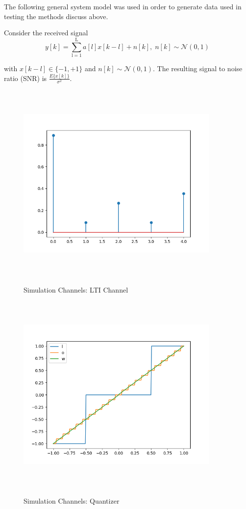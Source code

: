 \documentclass[12pt,a4paper]{report}
\begin{document}
The following general system model was used in order to generate data used in testing the methods discuss above.


Consider the received signal 
\begin{equation}
y[k] = \sum_{\mathrm{l=1}}^{\mathrm{L}} a[l]x[k-l] + n[k], \; n[k]  \sim \mathcal{N}(0,1)
\end{equation}

with $x[k-l] \in \{ -1, +1\}$ and $n[k]  \sim \mathcal{N}(0,1)$.  
The resulting signal to noise ratio (SNR) is 
$\frac{E\{x[k]\}}{\sigma^2}$.


\begin{figure}[H]
	  \caption{Simulation Channels: LTI Channel}
	\includegraphics[width=10cm,height = 10cm]{system_model/lti_channel}
	  \label{fig:LTI Channel}
\end{figure}
\begin{figure}[H]
	  \caption{Simulation Channels: Quantizer}
	\includegraphics[width=10cm,height = 10cm]{system_model/quantizer}
	  \label{fig:Quantized Channel}
\end{figure}
\end{document}
